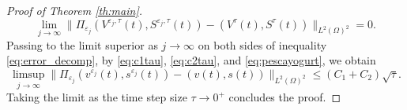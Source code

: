 \documentclass[a4paper,11pt]{article}
\theoremstyle{definition}
\numberwithin{equation}{section}
\begin{document}
\begin{proof}[Proof of Theorem \ref{th:main}]
\begin{equation}
	\label{eq:pescayogurt}
	\lim_{j \to \infty}\|\Pi_{\varepsilon_j}(V^{\varepsilon_j,\tau}(t),S^{\varepsilon_j,\tau}(t)) - (V^{\tau}(t),S^{\tau}(t))\|_{L^2(\Omega)^2} = 0.
\end{equation}
Passing to the limit superior as $j \to \infty$ on both sides of inequality \eqref{eq:error_decomp}, by \eqref{eq:c1tau}, \eqref{eq:c2tau}, and \eqref{eq:pescayogurt}, we obtain
\begin{equation*}
	\limsup_{j \to \infty}  \| \Pi_{\varepsilon_j} (v^{\varepsilon_j}(t),s^{\varepsilon_j}(t)) - (v(t),s(t))\|_{L^2(\Omega)^2}  \leq (C_1 + C_2) \sqrt{\tau}.
\end{equation*}
Taking the limit as the time step size $\tau \to 0^+$ concludes the proof.
\end{proof}
\end{document}
